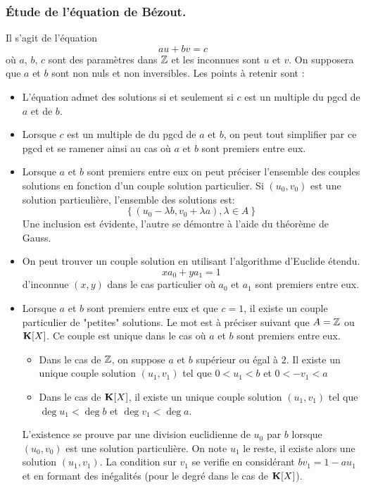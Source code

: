 \subsubsection{\'Etude de l'équation de Bézout.}
Il s'agit de l'équation
\begin{displaymath}
 au+bv=c
\end{displaymath}
où $a$, $b$, $c$ sont des paramètres dans $\mathbb{Z}$ et les inconnues sont $u$ et $v$. On supposera que $a$ et $b$ sont non nuls et non inversibles. Les points à retenir sont :
\begin{itemize}
 \item L'équation admet des solutions si et seulement si $c$ est un multiple du pgcd de $a$ et de $b$.
\item Lorsque $c$ est un multiple de du pgcd de $a$ et $b$, on peut tout simplifier par ce pgcd et se ramener ainsi au cas où $a$ et $b$ sont premiers entre eux.
\item Lorsque $a$ et $b$ sont premiers entre eux on peut préciser l'ensemble des couples solutions en fonction d'un couple solution particulier. Si $(u_0,v_0)$ est une solution particulière, l'ensemble des solutions est:
\begin{displaymath}
 \left\lbrace (u_0-\lambda b, v_0+\lambda a),\lambda \in A\right\rbrace 
\end{displaymath}
Une inclusion est évidente, l'autre se démontre à l'aide du théorème de Gauss.
\item  On peut trouver un couple solution en utilisant l'algorithme d'Euclide étendu.
\begin{displaymath}
 xa_0 + ya_1 =1
\end{displaymath}
 d'inconnue $(x,y)$ dans le cas particulier où $a_0$ et $a_1$ sont premiers entre eux.

\item Lorsque $a$ et $b$ sont premiers entre eux et que $c=1$, il existe un couple particulier de "petites" solutions. Le mot est à préciser suivant que $A=\mathbb{Z}$ ou $\mathbf{K}[X]$. Ce couple est unique dans le cas où $a$ et $b$ sont premiers entre eux.\begin{itemize}
 \item Dans le cas de $\mathbb{Z}$, on suppose $a$ et $b$ supérieur ou égal à $2$. Il existe un unique couple solution $(u_1,v_1)$ tel que $0<u_1<b$ et $0<-v_1<a$
\item Dans le cas de $\mathbf{K}[X]$, il existe un unique couple solution $(u_1,v_1)$ tel que $\deg u_1 < \deg b$ et $\deg v_1<\deg a$.
\end{itemize}
L'existence se prouve par une division euclidienne de $u_0$ par $b$ lorsque $(u_0,v_0)$ est une solution particulière. On note $u_1$ le reste, il existe alors une solution $(u_1,v_1)$. La condition sur $v_1$ se verifie en considérant $bv_1 = 1- au_1$ et en formant des inégalités (pour le degré dans le cas de $\mathbf{K}[X]$).
\end{itemize}


